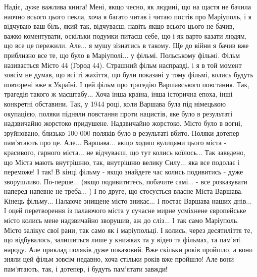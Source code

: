  
 
 
 
 



Надіє, дуже важлива книга! Мені, якщо чесно, як людині, що на щастя не бачила
наочно всього цього пекла, хоча я багато читав і читаю постів про Маріуполь, і
я відчуваю ваш біль, який так, відчуваєш, навіть якщо всього цього не бачив,
важко коментувати, оскільки подумки питаєш себе, що і як варто казати людям, що
все це пережили. Але... я мушу зізнатись в такому. Ще до війни я бачив вже
приблизно все те, що було в Маріуполі... у фільмі. Польському фільмі. Фільм
називається Місто 44 (Город 44). Страшний фільм насправді, і я в той момент
зовсім не думав, що всі ті жахіття, що були показані у тому фільмі, колись
будуть повторені вже в Україні. І цей фільм про трагедію Варшавського
повстання. Так, трагедія такого ж масштабу...  Хоча інша країна, інша історична
епоха, інші конкретні обставини. Так, у 1944 році, коли Варшава була під
німецькою окупацією, поляки підняли повстання проти нацистів, яке було в
результаті надзвичайно жорстоко придушене. Надзвичайно жорстоко. Місто було в
вогні, зруйновано, близько 100 000 поляків було в результаті вбито. Поляки
дотепер пам'ятають про це. Але... Варшава... якщо ходиш вулицями цього міста -
красивого, гарного міста... не відчуваєш, що тут колись коїлось... Так
заведено, що Міста мають внутрішню, так, внутрішню велику Силу... яка все
подолає і переможе! І так! В кінці фільму - якщо знайдете час колись подивитись
- дуже зворушливо. По-перше... (якщо подивититесь, побачите самі... - все
розказувати наперед напевне не треба... )  І по друге, що стосується власне
Міста Варшава. Кінець фільму... Палаюче знищене місто зникає... І постає
Варшава наших днів... І оцей перетворення із палаючого міста у сучасне мирне
усміхнене європейське місто колись мене надзвичайно зворушив, аж до сліз... І
так само Маріуполь. Місто залікує свої рани, так само як і маріупольці. І
колись, через десятиліття те, що відбувалось, залишиться лише у книжках та у
відео та фільмах, та пам'яті народу. Але приклад поляків дуже показовий. Вже
скільки років пройшло, а вони зняли цей фільм зовсім недавно, хоча стільки
років вже пройшло! Але вони пам'ятають, так, і дотепер, і будуть пам'ятати
завжди! 

